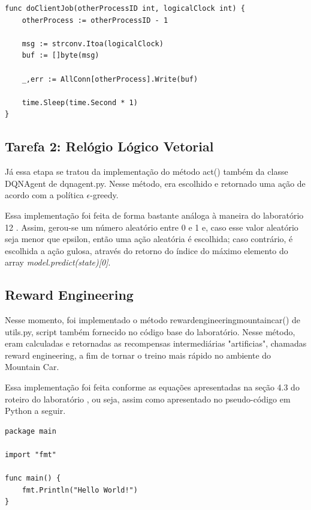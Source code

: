 \documentclass[conference]{IEEEtran}
\begin{document}
\begin{lstlisting}
func doClientJob(otherProcessID int, logicalClock int) {
	otherProcess := otherProcessID - 1

	msg := strconv.Itoa(logicalClock)
	buf := []byte(msg)

	_,err := AllConn[otherProcess].Write(buf)

	time.Sleep(time.Second * 1)
}
\end{lstlisting}

	\subsection{Tarefa 2: Relógio Lógico Vetorial}

	Já essa etapa se tratou da implementação do método act() também da classe DQNAgent de dqn\underline{\space}agent.py. Nesse método, era escolhido e retornado uma ação de acordo com a política $\epsilon$-greedy.
	
	Essa implementação foi feita de forma bastante análoga à maneira do laboratório 12 \cite{roteiro12}. Assim, gerou-se um número aleatório entre 0 e 1 e, caso esse valor aleatório seja menor que epsilon, então uma ação aleatória é escolhida; caso contrário, é escolhida a ação gulosa, através do retorno do índice do máximo elemento do array \textit{model.predict(state)[0]}.
		
	\subsection{Reward Engineering}
	
	Nesse momento, foi implementado o método reward\underline{\space}engineering\underline{\space}mountain\underline{\space}car() de utils.py, script também fornecido no código base do laboratório. Nesse método, eram calculadas e retornadas as recompensas intermediárias "artificias", chamadas reward engineering, a fim de tornar o treino mais rápido no ambiente do Mountain Car.
	
	Essa implementação foi feita conforme as equações apresentadas na seção 4.3 do roteiro do laboratório \cite{roteiro}, ou seja, assim como apresentado no pseudo-código em Python a seguir.
	
\begin{lstlisting}
package main

import "fmt"

func main() {
    fmt.Println("Hello World!")
}
\end{lstlisting}
\end{document}
